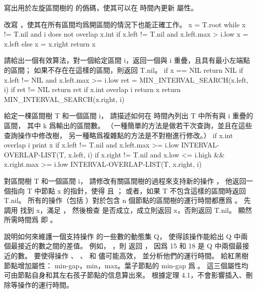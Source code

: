 \startsection[
  title={Interval trees},
]

\startEXERCISE
寫出用於左旋區間樹的  的僞碼，使其可以在  時間內更新 \m{\max} 屬性。
\stopEXERCISE
\startANSWER
{}
\stopANSWER

\startEXERCISE
改寫 ，使其在所有區間均爲開區間的情況下也能正確工作。
\stopEXERCISE
\startANSWER
{}
\startCLRS
x = T.root
while x != T.nil and i does not overlap x.int
	if x.left != T.nil and x.left.max > i.low
		x = x.left
	else x = x.right
return x
\stopCLRS
\stopANSWER

\startEXERCISE
請給出一個有效算法，對一個給定區間 i，返回一個與 i 重疊，且具有最小左端點的區間；
如果不存在在這樣的區間，則返回 T.nil。
\stopEXERCISE
\startANSWER
{}
\startCLRS
if x == NIL
	return NIL
if x.left != NIL and x.left.max >= i.low
	ret = MIN_INTERVAL_SEARCH(x.left, i)
	if ret != NIL
		return ret
if x.int overlap i
	return x
return MIN_INTERVAL_SEARCH(x.right, i)
\stopCLRS
\stopANSWER

\startEXERCISE
給定一棵區間樹 T 和一個區間 i，
請描述如何在  時間內列出 T 中所有與 i 重疊的區間，
其中 k 爲輸出的區間數。
（\hint 一種簡單的方法是做若干次查詢，並且在這些查詢操作中修改樹，
另一種略爲複雜點的方法是不對樹進行修改。）
\stopEXERCISE
\startANSWER
{}
\startCLRS
if x.int overlap i
	print x
if x.left != T.nil and x.left.max >= i.low
	INTERVAL-OVERLAP-LIST(T, x.left, i)
if x.right != T.nil and x.low <= i.high && x.right.max >= i.low
	INTERVAL-OVERLAP-LIST(T, x.right, i)
\stopCLRS
\stopANSWER

\startEXERCISE
對區間樹 T 和一個區間 i，
請修改有關區間樹的過程來支持新的操作 ，
他返回一個指向 T 中節點 x 的指針，使得  且 ；
或者，如果 T 不包含這樣的區間時返回 T.nil。
所有的操作（包括 ）對於包含 n 個節點的區間樹的運行時間都應爲 。
\stopEXERCISE
\startANSWER
先調用  找到 x，滿足 ，
然後檢查  是否成立，成立則返回 x，否則返回 T.nil。
顯然所需時間爲  即 。
\stopANSWER

\startEXERCISE
說明如何來維護一個支持操作  的一些數的動態集 Q，
使得該操作能給出 Q 中兩個最接近的數之間的差值。
例如， ，則  返回 ，
因爲 15 和 18 是 Q 中兩個最接近的數。
要使得操作 、 、  和  儘可能高效，
並分析他們的運行時間。
\stopEXERCISE
\startANSWER
給紅黑樹節點增加屬性： min-gap，min，max。葉子節點的 min-gap 爲 \m{\infty}。
這三個屬性均可由節點自身和其左右孩子節點的信息算出來。
根據定理 4.1，不會影響插入、刪除等操作的運行時間。

